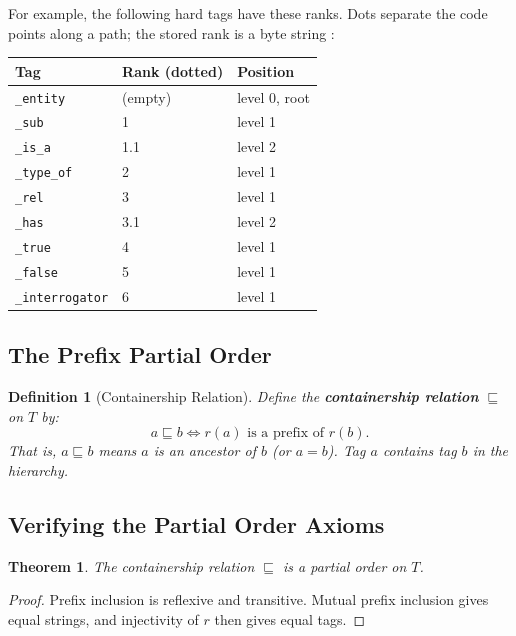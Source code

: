 \documentclass{article}
\newtheorem{definition}{Definition}[section]
\newtheorem{theorem}{Theorem}[section]
\begin{document}
For example, the following hard tags have these ranks. Dots separate the
code points along a path; the stored rank is a byte string \cite{bootstrap}:

\begin{center}
\begin{tabularx}{\textwidth}{@{}YYY@{}}
\toprule
\textbf{Tag} & \textbf{Rank (dotted)} & \textbf{Position} \\
\midrule
\texttt{\_entity}       & (empty)  & level 0, root \\
\texttt{\_sub}          & 1        & level 1 \\
\texttt{\_is\_a}        & 1.1      & level 2 \\
\texttt{\_type\_of}     & 2        & level 1 \\
\texttt{\_rel}          & 3        & level 1 \\
\texttt{\_has}          & 3.1      & level 2 \\
\texttt{\_true}         & 4        & level 1 \\
\texttt{\_false}        & 5        & level 1 \\
\texttt{\_interrogator} & 6        & level 1 \\
\bottomrule
\end{tabularx}
\end{center}

\subsection{The Prefix Partial Order}

\begin{definition}[Containership Relation]
Define the \textbf{containership relation} $\sqsubseteq$ on $T$ by:
\[
  a \sqsubseteq b
  \iff
  r(a) \text{ is a prefix of } r(b).
\]
That is, $a \sqsubseteq b$ means $a$ is an ancestor of $b$ (or $a = b$). Tag
$a$ \emph{contains} tag $b$ in the hierarchy.
\end{definition}

\subsection{Verifying the Partial Order Axioms}

\begin{theorem}
The containership relation $\sqsubseteq$ is a partial order on $T$.
\end{theorem}

\begin{proof}
Prefix inclusion is reflexive and transitive. Mutual prefix inclusion gives
equal strings, and injectivity of $r$ then gives equal tags.
\end{proof}
\end{document}
